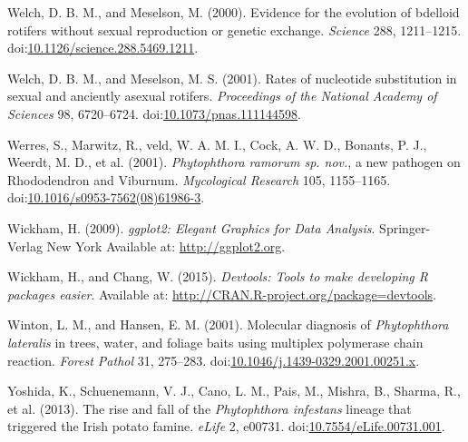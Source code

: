 \documentclass[double,12pt]{beavtex}
\begin{document}
  \hypertarget{ref-welch2000evidence}{}
  Welch, D. B. M., and Meselson, M. (2000). Evidence for the evolution of
  bdelloid rotifers without sexual reproduction or genetic exchange.
  \emph{Science} 288, 1211--1215.
  doi:\href{https://doi.org/10.1126/science.288.5469.1211}{10.1126/science.288.5469.1211}.
  
  \hypertarget{ref-welch2001rates}{}
  Welch, D. B. M., and Meselson, M. S. (2001). Rates of nucleotide
  substitution in sexual and anciently asexual rotifers. \emph{Proceedings
  of the National Academy of Sciences} 98, 6720--6724.
  doi:\href{https://doi.org/10.1073/pnas.111144598}{10.1073/pnas.111144598}.
  
  \hypertarget{ref-werres2001phytophthora}{}
  Werres, S., Marwitz, R., veld, W. A. M. I., Cock, A. W. D., Bonants, P.
  J., Weerdt, M. D., et al. (2001). \emph{Phytophthora ramorum sp. nov.},
  a new pathogen on Rhododendron and Viburnum. \emph{Mycological Research}
  105, 1155--1165.
  doi:\href{https://doi.org/10.1016/s0953-7562(08)61986-3}{10.1016/s0953-7562(08)61986-3}.
  
  \hypertarget{ref-wickham2009ggplot2}{}
  Wickham, H. (2009). \emph{ggplot2: Elegant Graphics for Data Analysis}.
  Springer-Verlag New York Available at: \url{http://ggplot2.org}.
  
  \hypertarget{ref-wickham2015devtools}{}
  Wickham, H., and Chang, W. (2015). \emph{Devtools: Tools to make
  developing R packages easier}. Available at:
  \url{http://CRAN.R-project.org/package=devtools}.
  
  \hypertarget{ref-winton2001molecular}{}
  Winton, L. M., and Hansen, E. M. (2001). Molecular diagnosis of
  \emph{Phytophthora lateralis} in trees, water, and foliage baits using
  multiplex polymerase chain reaction. \emph{Forest Pathol} 31, 275--283.
  doi:\href{https://doi.org/10.1046/j.1439-0329.2001.00251.x}{10.1046/j.1439-0329.2001.00251.x}.
  
  \hypertarget{ref-yoshida2013rise}{}
  Yoshida, K., Schuenemann, V. J., Cano, L. M., Pais, M., Mishra, B.,
  Sharma, R., et al. (2013). The rise and fall of the \emph{Phytophthora
  infestans} lineage that triggered the Irish potato famine. \emph{eLife}
  2, e00731.
  doi:\href{https://doi.org/10.7554/eLife.00731.001}{10.7554/eLife.00731.001}.
\end{document}
